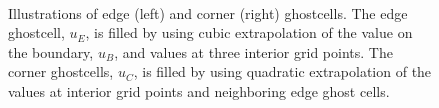 \documentclass[oneeqnum,onefignum,onetabnum,onethmnum]{siamltex}
\begin{document}
\begin{figure}[htb]
\begin{center}
\ \ \ \ \ \ \ \ \ \ \ \ \ 
\caption{Illustrations of edge (left) and corner (right) ghostcells.
The edge ghostcell, $u_E$, is filled by using cubic extrapolation of 
the value on the boundary, $u_B$, and values at three interior grid points.  
The corner ghostcells, $u_C$, is filled by using quadratic extrapolation 
of the values at interior grid points and neighboring edge ghost cells.
}
\label{fig:ghost_cells}
\end{center}
\end{figure}
\end{document}
